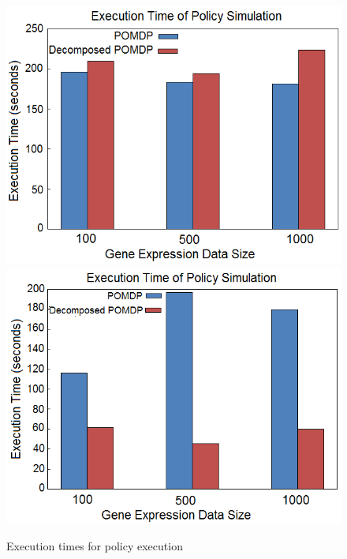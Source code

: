 \begin{figure}[h!]
\centering
\includegraphics[scale=0.5]{experiments/graph5.png}
\includegraphics[scale=0.5]{experiments/graph6.png}
\caption{Execution times for policy execution}\label{figure:policyexecution}
\end{figure}
